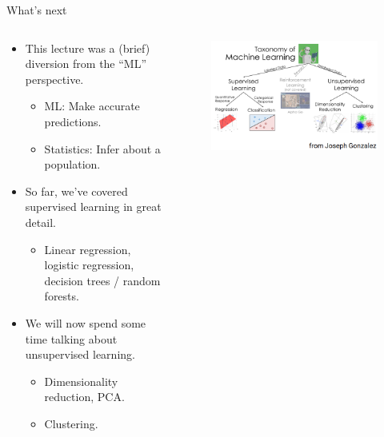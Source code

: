 \documentclass[aspectratio=169]{../latex_main/tntbeamer}  %
\begin{document}
	\begin{frame}{What’s next}
	    \begin{columns}
	        \begin{column}{.5\textwidth}
	                \begin{itemize}
	                    \item This lecture was a (brief) diversion from the “ML” perspective.
	                    \begin{itemize}
	                        \item ML: Make accurate predictions.
	                        \item Statistics: Infer about a population.
	                    \end{itemize}
	                    \item So far, we’ve covered supervised learning in great detail.
	                    \begin{itemize}
	                        \item Linear regression, logistic regression, decision trees / random forests.
	                    \end{itemize}
	                    \item We will now spend some time talking about unsupervised learning.
	                    \begin{itemize}
	                        \item Dimensionality reduction, PCA.
	                        \item Clustering.
	                    \end{itemize}
	                \end{itemize}
	        \end{column}
	        
	        
	        \begin{column}{.5\textwidth}
	                \begin{figure}
	                    \centering
	                    \includegraphics[scale=.45]{Bild14}
	                \end{figure}
	        \end{column}
	    \end{columns}
	\end{frame}
\end{document}
